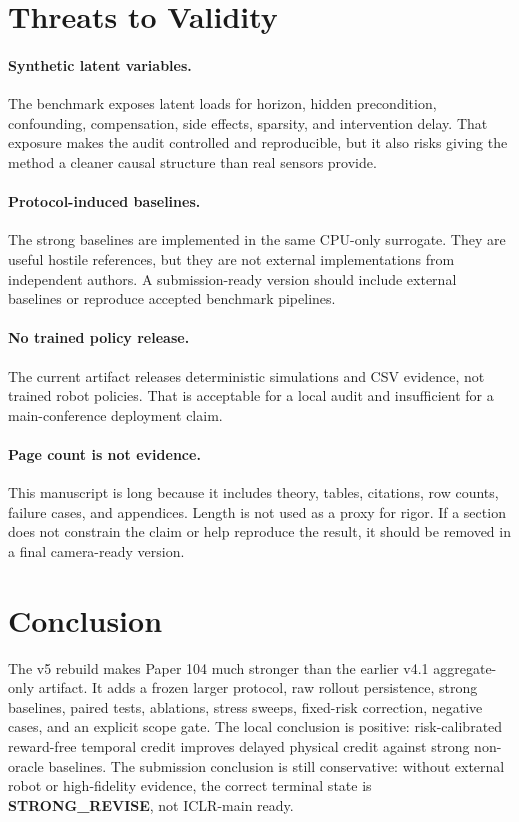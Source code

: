 \documentclass{article}
\begin{document}
\section{Threats to Validity}
\paragraph{Synthetic latent variables.}
The benchmark exposes latent loads for horizon, hidden precondition, confounding, compensation, side effects, sparsity, and intervention delay. That exposure makes the audit controlled and reproducible, but it also risks giving the method a cleaner causal structure than real sensors provide.

\paragraph{Protocol-induced baselines.}
The strong baselines are implemented in the same CPU-only surrogate. They are useful hostile references, but they are not external implementations from independent authors. A submission-ready version should include external baselines or reproduce accepted benchmark pipelines.

\paragraph{No trained policy release.}
The current artifact releases deterministic simulations and CSV evidence, not trained robot policies. That is acceptable for a local audit and insufficient for a main-conference deployment claim.

\paragraph{Page count is not evidence.}
This manuscript is long because it includes theory, tables, citations, row counts, failure cases, and appendices. Length is not used as a proxy for rigor. If a section does not constrain the claim or help reproduce the result, it should be removed in a final camera-ready version.

\section{Conclusion}
The v5 rebuild makes Paper 104 much stronger than the earlier v4.1 aggregate-only artifact. It adds a frozen larger protocol, raw rollout persistence, strong baselines, paired tests, ablations, stress sweeps, fixed-risk correction, negative cases, and an explicit scope gate. The local conclusion is positive: risk-calibrated reward-free temporal credit improves delayed physical credit against strong non-oracle baselines. The submission conclusion is still conservative: without external robot or high-fidelity evidence, the correct terminal state is \textbf{STRONG\_REVISE}, not ICLR-main ready.
\end{document}
